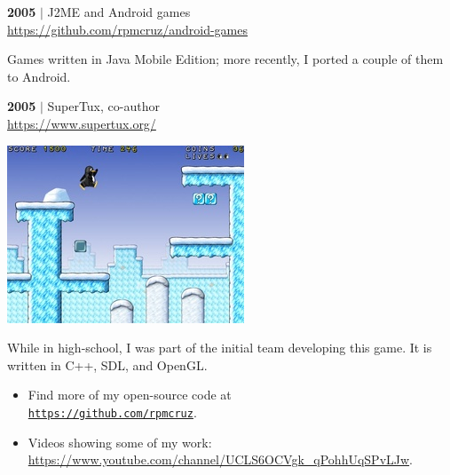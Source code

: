 \documentclass[11pt]{article}
\begin{document}
\begin{multicols}{2}
\begin{samepage}
\begin{adjustwidth}{1.5em}{}
\end{adjustwidth}
\end{samepage}\begin{samepage}\textbf{2005} $\vert$ J2ME and Android games
\\{\footnotesize \url{https://github.com/rpmcruz/android-games}}\begin{adjustwidth}{1.5em}{}%
\footnotesize
Games written in Java Mobile Edition; more recently, I ported a couple of them to Android.\par\end{adjustwidth}
\end{samepage}\begin{samepage}\textbf{2005} $\vert$ SuperTux, co-author
\\{\footnotesize \url{https://www.supertux.org/}}\\{\footnotesize\begin{minipage}{0.35\linewidth}\includegraphics[width=\linewidth]{imgs/cv-supertux.jpg}\end{minipage}\hfill\begin{minipage}{0.64\linewidth}While in high-school, I was part of the initial team developing this game. It is written in C++, SDL, and OpenGL.\end{minipage}}\par\end{samepage}
\begin{itemize}
\small
\renewcommand{\labelitemi}{$\blacktriangleright$}
\setlength{\itemindent}{-1.5em}
\itemsep0em 
\item Find more of my open-source code at\\\href{https://github.com/rpmcruz?tab=repositories}{\tt https://github.com/rpmcruz}.
\item Videos showing some of my work: \url{https://www.youtube.com/channel/UCLS6OCVgk_qPohhUqSPvLJw}.
\end{itemize}
\end{multicols}
\end{document}
